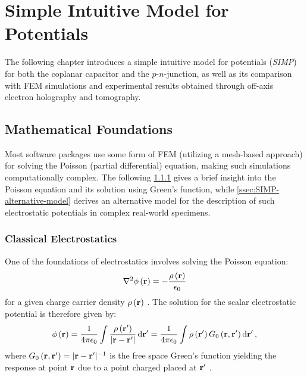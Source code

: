 \chapter{Simple Intuitive Model for Potentials} \label{chap:SIMP}
The following chapter introduces a simple intuitive model for potentials (\emph{SIMP}) for both the coplanar capacitor and the $p$-$n$-junction, as well as its comparison with FEM simulations and experimental results obtained through off-axis electron holography and tomography.
\section{Mathematical Foundations}
Most software packages use some form of FEM (utilizing a mesh-based approach) for solving the Poisson (partial differential) equation, making such simulations computationally complex. The following \cref{ssec:classical-electrostatics} gives a brief insight into the Poisson equation and its solution using Green's function, while \cref{ssec:SIMP-alternative-model} derives an alternative model for the description of such electrostatic potentials in complex real-world specimens.
\subsection{Classical Electrostatics} \label{ssec:classical-electrostatics}
One of the foundations of electrostatics involves solving the Poisson equation:
\begin{equation}
  \laplacian \phi \left(\vb{r}\right) = -\frac{\rho\left(\vb{r}\right)}{\epsilon_0}
\end{equation}
for a given charge carrier density $\rho\left(\vb{r}\right)$ \cite{Jackson1999}. The solution for the scalar electrostatic potential is therefore given by:
\begin{equation}
  \phi \left(\vb{r}\right) = \frac{1}{4\pi \epsilon_0} \int \frac{\rho\left(\vb{r'}\right)}{\lvert \vb{r} - \vb{r'}\rvert} \dd{\vb{r'}} = \frac{1}{4\pi \epsilon_0} \int \rho\left(\vb{r'}\right) G_0\left(\vb{r}, \vb{r'}\right) \dd{\vb{r'}},
\end{equation}
where $G_0\left(\vb{r}, \vb{r'}\right) = \lvert \vb{r} - \vb{r'}\rvert^{-1}$ is the free space Green's function yielding the response at point $\vb{r}$ due to a point charged placed at $\vb{r'}$ \cite{Jackson1999}.

